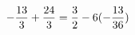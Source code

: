 \documentclass[preview]{standalone}
\begin{document}
\begin{align*}
\special{dvisvgm:raw <g id='unique000'>}- \frac{13}{3} + \frac{24}{3} = \frac{3}{2} - 6(- \frac{13}{36})\special{dvisvgm:raw </g>}
\end{align*}
\end{document}
